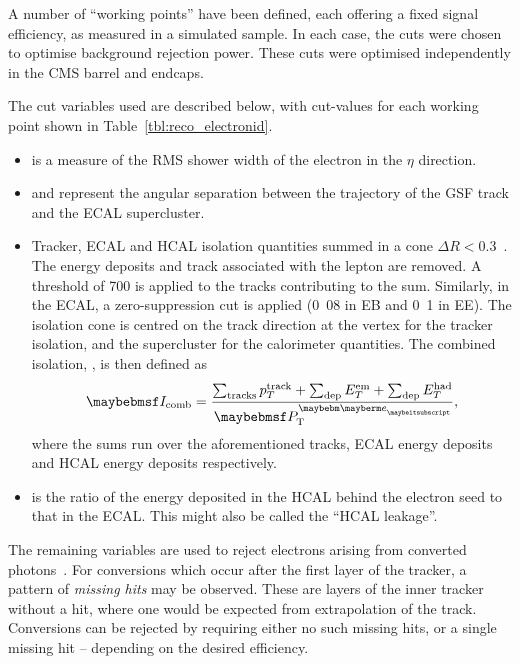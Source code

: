 A number of ``working points'' have been defined, each offering a fixed signal
efficiency, as measured in a simulated \Wenu sample. In each case, the cuts were
chosen to optimise background rejection power. These cuts were optimised
independently in the \ac{CMS} barrel and endcaps.

The cut variables used are described below, with cut-values for each working
point shown in Table~\ref{tbl:reco_electronid}.
\begin{itemize}
\item \sigmaieta is a measure of the \ac{RMS} shower width of the electron
  in the $\eta$ direction.
\item \deltaphiin and \deltaetain represent the angular separation between the
  trajectory of the \ac{GSF} track and the \ac{ECAL} supercluster.
\item Tracker, \ac{ECAL} and \ac{HCAL} isolation quantities summed in a cone
  $\Delta R < 0.3$~\cite{lepton_isolation_an}. The energy deposits and track
  associated with the lepton are removed. A threshold of \unit{700}{\MeV} is
  applied to the tracks contributing to the sum. Similarly, in the \ac{ECAL}, a
  zero-suppression cut is applied (\unit{0.08}{\GeV} in \ac{EB} and
  \unit{0.1}{\GeV} in \ac{EE}). The isolation cone is centred on the track
  direction at the vertex for the tracker isolation, and the supercluster for
  the calorimeter quantities. The combined isolation, \CombIso, is then defined
  as
  \begin{equation*}
    \CombIso = \frac{\sum_{\textrm{tracks}} p_T^{\textrm{track}} + \sum_{\textrm{dep}}
    E_T^{\textrm{em}} + \sum_{\textrm{dep}} E_T^{\textrm{had}}}{\Pte},
   \end{equation*}
   where the sums run over the aforementioned tracks, \ac{ECAL} energy deposits
   and \ac{HCAL} energy deposits respectively.
 \item \HoverE is the ratio of the energy deposited in the \ac{HCAL} behind the
   electron seed to that in the \ac{ECAL}. This might also be called the
   ``\ac{HCAL} leakage''.
\end{itemize}

The remaining variables are used to reject electrons arising from converted
photons~\cite{cms_an_2009_159}. For conversions which occur after the first
layer of the tracker, a pattern of \emph{missing hits} may be observed. These
are layers of the inner tracker without a hit, where one would be expected from
extrapolation of the track. Conversions can be rejected by requiring either no
such missing hits, or a single missing hit -- depending on the desired
efficiency.

